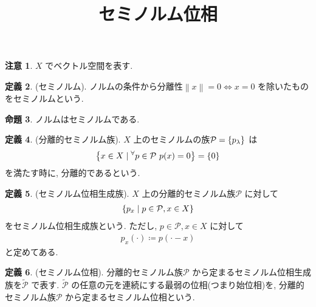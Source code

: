 \documentclass[twocolumn, landscape, a4paper , 8pt, fleqn, titlepage ]{jsarticle}
\title{セミノルム位相}
\author{}
\date{}
\theoremstyle{definition}
\newtheorem{dfn}{定義}[section]
\newtheorem{prop}[dfn]{命題}
\newtheorem{remark}[dfn]{注意}
\newcommand{\any}{{}^{\forall}}
\newcommand{\cbra}[1]{\mleft\{#1\mright\}}
\newcommand{\norm}[1]{\left\|#1\right\|}
\newcommand{\LR}{\Leftrightarrow}
\begin{document}
\maketitle
\scriptsize 

\section{}

\begin{remark}
$X$ でベクトル空間を表す.
\end{remark}

\begin{dfn}(セミノルム).
ノルムの条件から分離性$\norm{x} = 0 \LR x = 0$ を除いたものをセミノルムという.
\end{dfn}

\begin{prop}
ノルムはセミノルムである.
\end{prop}

\begin{dfn}(分離的セミノルム族).
$X$ 上のセミノルムの族$\mathcal P = \cbra{p_\lambda}$ は
\begin{align*} \cbra{x \in X \mid \any p \in \mathcal P \,\, p(x) = 0} = \cbra{0} \end{align*}
を満たす時に, 分離的であるという.
\end{dfn}

\begin{dfn}(セミノルム位相生成族). $X$ 上の分離的セミノルム族$\mathcal P $ に対して 
\begin{align*} \cbra{p_x \mid p \in \mathcal P, x \in X} \end{align*}
をセミノルム位相生成族という. ただし, $p \in \mathcal P , x \in X$ に対して
\begin{align*} p_x (\cdot) \coloneqq p(\cdot - x) \end{align*}
と定めてある.
\end{dfn}

\begin{dfn}(セミノルム位相). 分離的セミノルム族$\mathcal P$ から定まるセミノルム位相生成族を$\tilde {\mathcal P}$ で表す. $\tilde{\mathcal P}$ の任意の元を連続にする最弱の位相(つまり始位相)を, 分離的セミノルム族$\mathcal P$ から定まるセミノルム位相という.
\end{dfn}
\end{document}
